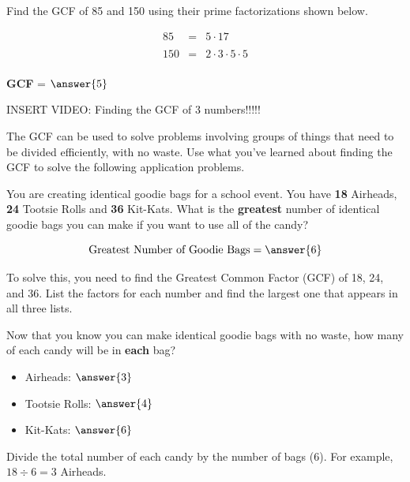 \documentclass{ximera}[font=12pt]  %
\begin{document}
\begin{problem}
Find the GCF of 85 and 150 using their prime factorizations shown below.


\begin{eqnarray*}
85 &=& 5 \cdot 17 \\
   & & \\
150 &=& 2 \cdot 3 \cdot 5 \cdot 5 \\
\end{eqnarray*}


\textbf{GCF} = $\answer{5}$

\end{problem}


INSERT VIDEO:  Finding the GCF of 3 numbers!!!!!

The GCF can be used to solve problems involving groups of things that need to be divided efficiently, with no waste.  Use what you've learned
about finding the GCF to solve the following application problems.

\begin{problem}
  You are creating identical goodie bags for a school event. You have \textbf{18} Airheads, \textbf{24} Tootsie Rolls and
  \textbf{36} Kit-Kats.  What is the \textbf{greatest} number of identical goodie bags you can make if you want to use all of the candy?

  \[ \textrm{Greatest Number of Goodie Bags} = \answer{6} \] 

  \begin{hint}
    To solve this, you need to find the Greatest Common Factor (GCF) of 18, 24, and 36. List the factors for each number and find the largest one that appears in all three lists.
  \end{hint}

  Now that you know you can make identical goodie bags with no waste, how many of each candy will be in \textbf{each} bag?

  \begin{itemize}
      \item Airheads: $\answer{3}$
      \item Tootsie Rolls: $\answer{4}$
      \item Kit-Kats: $\answer{6}$
  \end{itemize}
  
  \begin{hint}
    Divide the total number of each candy by the number of bags (6). For example, $18 \div 6 = 3$ Airheads.
  \end{hint}


\end{problem}
\end{document}
